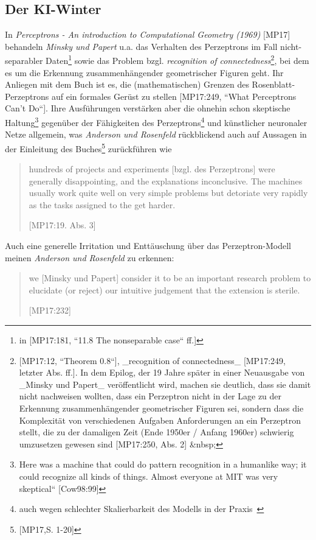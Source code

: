 \subsection{Der KI-Winter}\label{kiwinter}

In \textit{Perceptrons - An introduction to Computational Geometry (1969)} [MP17] behandeln \textit{Minsky und Papert} u.a. das Verhalten des Perzeptrons im Fall nicht-separabler Daten\footnote{
    in [MP17:181, ``11.8 The nonseparable case`` ff.]
} sowie das Problem bzgl. \textit{recognition of connectedness}\footnote{
    [MP17:12, ``Theorem 0.8``],  _recognition of connectedness_ [MP17:249, letzter Abs. ff.]. In dem Epilog, der 19 Jahre später in einer Neuausgabe von _Minsky und Papert_ veröffentlicht wird, machen sie deutlich, dass sie damit nicht nachweisen wollten, dass ein Perzeptron nicht in der Lage zu der Erkennung zusammenhängender geometrischer Figuren sei, sondern dass die Komplexität von verschiedenen Aufgaben Anforderungen an ein Perzeptron stellt, die zu der damaligen Zeit (Ende 1950er / Anfang 1960er) schwierig umzusetzen gewesen sind [MP17:250, Abs. 2] &nbsp;
}, bei dem es um die Erkennung zusammenhängender geometrischer Figuren geht.
Ihr Anliegen mit dem Buch ist es, die (mathematischen) Grenzen des Rosenblatt-Perzeptrons auf ein formales Gerüst zu stellen [MP17:249, ``What Perceptrons Can't Do``].
Ihre Ausführungen verstärken aber die ohnehin schon skeptische Haltung\footnote{
    Here was a machine that could do pattern recognition in a humanlike way; it could recognize all kinds of things. Almost everyone at MIT was very skeptical`` [Cow98:99]
} gegenüber der Fähigkeiten des Perzeptrons\footnote{
    auch wegen schlechter Skalierbarkeit des Modells in der Praxis~\cite[159]{AR88}
} und künstlicher neuronaler Netze allgemein, was \textit{Anderson und Rosenfeld} rückblickend auch auf Aussagen in der Einleitung des Buches\footnote{
    [MP17,S. 1-20]
} zurückführen wie

\blockquote[{[MP17:19. Abs. 3]}]{
hundreds of projects and experiments [bzgl. des Perzeptrons] were generally disappointing, and the explanations inconclusive. The machines usually work quite well on very simple problems but detoriate very rapidly as the tasks assigned to the get harder.
}

\noindent
Auch eine generelle Irritation und Enttäuschung über das Perzeptron-Modell meinen \textit{Anderson und Rosenfeld} zu erkennen:

\blockquote[{[MP17:232]}]{
we [Minsky und Papert] consider it to be an important research problem to elucidate (or reject) our intuitive judgement that the extension is sterile.
}

